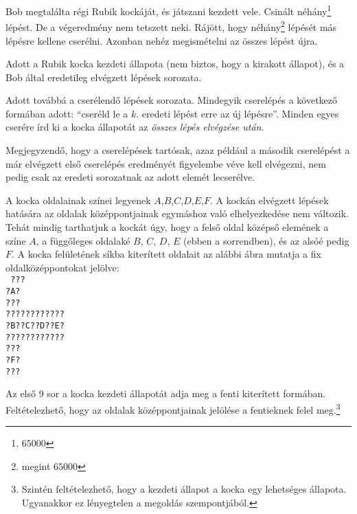 





Bob megtalálta régi Rubik kockáját, és játszani kezdett vele. Csinált néhány\footnote{$65000$} lépést. De a végeredmény nem tetszett neki. Rájött, hogy néhány\footnote{megint $65000$} lépését más lépésre kellene cserélni. Azonban nehéz megismételni az összes lépést újra.


Adott a Rubik kocka kezdeti állapota (nem biztos, hogy a kirakott állapot), és a Bob által eredetileg elvégzett lépések sorozata.

Adott továbbá a cserélendő lépések sorozata. Mindegyik cserelépés a következő formában adott: ``cseréld le a $k$. eredeti lépést erre az új lépésre''. Minden egyes cserére írd ki a kocka állapotát az \emph{összes lépés elvégzése után}.

Megjegyzendő, hogy a cserelépések tartósak, azaz például a második cserelépést a már elvégzett első cserelépés eredményét figyelembe véve kell elvégezni, nem pedig csak az eredeti sorozatnak az adott elemét lecserélve.



A kocka oldalainak színei legyenek $A$,$B$,$C$,$D$,$E$,$F$. A kockán elvégzett lépések hatására az oldalak közép\-pontjainak egymáshoz való elhelyezkedése nem változik. Tehát mindig tarthatjuk a kockát úgy, hogy a felső oldal középső elemének a színe $A$, a függőleges oldalaké $B$, $C$, $D$, $E$ (ebben a sorrendben), és az alsóé pedig $F$. A kocka felületének síkba kiterített oldalait az alábbi ábra mutatja a fix oldalközéppontokat jelölve:\\
\texttt{
???\\
?A?\\
???\\
????????????\\
?B??C??D??E?\\
????????????\\
???\\
?F?\\
???\\
}


Az első 9 sor a kocka kezdeti állapotát adja meg a fenti kiterített formában. Feltételezhető, hogy az oldalak középpontjainak jelölése a fentieknek felel meg.\footnote{Szintén feltételezhető, hogy a kezdeti állapot a kocka egy lehetséges állapota. Ugyanakkor ez lényegtelen a megoldás szempontjából.}

